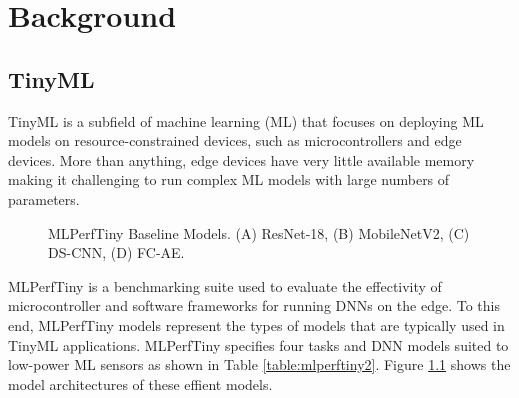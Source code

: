 \chapter{Background}

\label{chapter:background}

\section{TinyML}
\label{section:TinyML}

TinyML is a subfield of machine learning (ML) that focuses on deploying ML models on resource-constrained devices, such as microcontrollers and edge devices. More than anything, edge devices have very little available memory making it challenging to run complex ML models with large numbers of parameters.

\begin{table}[]
\label{table:mlperftiny2}
\caption{MLPerfTiny Baseline Models and Datasets}
\end{table}

\begin{figure}
    \centering
    
    \caption{MLPerfTiny Baseline Models. (A) ResNet-18, (B) MobileNetV2, (C) DS-CNN, (D) FC-AE.}
    \label{fig:mlperftiny_models}
\end{figure}

MLPerfTiny is a benchmarking suite used to evaluate the effectivity of microcontroller and software frameworks for running DNNs on the edge. To this end, MLPerfTiny models \cite{banbury2021mlperf} represent the types of models that are typically used in TinyML applications.  MLPerfTiny \cite{banbury2021mlperf} specifies four tasks and DNN models suited to low-power ML sensors as shown in Table \ref{table:mlperftiny2}. Figure \ref{fig:mlperftiny_models} shows the model architectures of these effient models.

